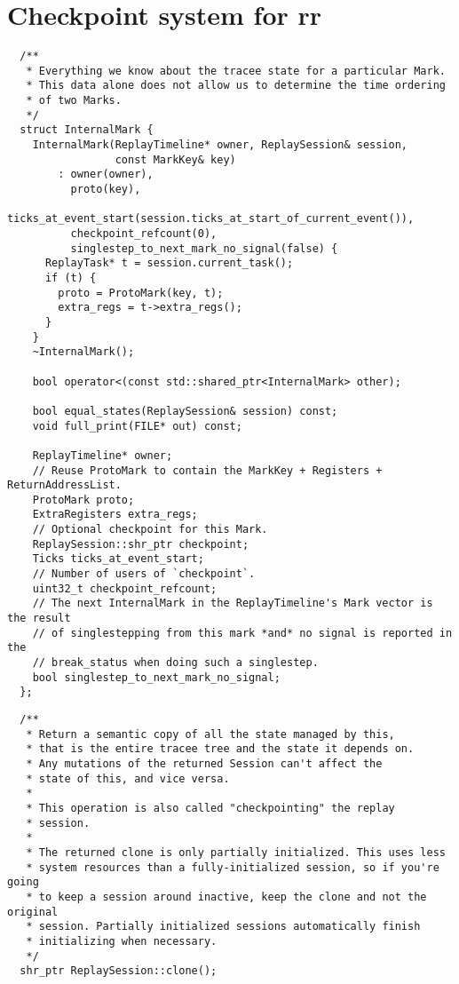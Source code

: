 \section{Checkpoint system for rr}
\begin{verbatim}
  /**
   * Everything we know about the tracee state for a particular Mark.
   * This data alone does not allow us to determine the time ordering
   * of two Marks.
   */
  struct InternalMark {
    InternalMark(ReplayTimeline* owner, ReplaySession& session,
                 const MarkKey& key)
        : owner(owner),
          proto(key),
          ticks_at_event_start(session.ticks_at_start_of_current_event()),
          checkpoint_refcount(0),
          singlestep_to_next_mark_no_signal(false) {
      ReplayTask* t = session.current_task();
      if (t) {
        proto = ProtoMark(key, t);
        extra_regs = t->extra_regs();
      }
    }
    ~InternalMark();

    bool operator<(const std::shared_ptr<InternalMark> other);

    bool equal_states(ReplaySession& session) const;
    void full_print(FILE* out) const;

    ReplayTimeline* owner;
    // Reuse ProtoMark to contain the MarkKey + Registers + ReturnAddressList.
    ProtoMark proto;
    ExtraRegisters extra_regs;
    // Optional checkpoint for this Mark.
    ReplaySession::shr_ptr checkpoint;
    Ticks ticks_at_event_start;
    // Number of users of `checkpoint`.
    uint32_t checkpoint_refcount;
    // The next InternalMark in the ReplayTimeline's Mark vector is the result
    // of singlestepping from this mark *and* no signal is reported in the
    // break_status when doing such a singlestep.
    bool singlestep_to_next_mark_no_signal;
  };
\end{verbatim}
\begin{verbatim}
  /**
   * Return a semantic copy of all the state managed by this,
   * that is the entire tracee tree and the state it depends on.
   * Any mutations of the returned Session can't affect the
   * state of this, and vice versa.
   *
   * This operation is also called "checkpointing" the replay
   * session.
   *
   * The returned clone is only partially initialized. This uses less
   * system resources than a fully-initialized session, so if you're going
   * to keep a session around inactive, keep the clone and not the original
   * session. Partially initialized sessions automatically finish
   * initializing when necessary.
   */
  shr_ptr ReplaySession::clone();
\end{verbatim}

